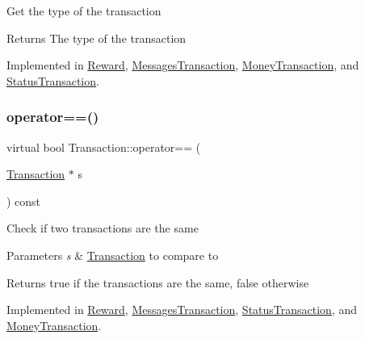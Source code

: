 Get the type of the transaction

\begin{DoxyReturn}{Returns}
The type of the transaction 
\end{DoxyReturn}


Implemented in \mbox{\hyperlink{classReward_a1d3d05263d54771a314927d09585968c}{Reward}}, \mbox{\hyperlink{classMessagesTransaction_a1893ac38468108811eb396366a3c0454}{Messages\+Transaction}}, \mbox{\hyperlink{classMoneyTransaction_a705918a47c0471ee7cf82bcdf0aeb5ef}{Money\+Transaction}}, and \mbox{\hyperlink{classStatusTransaction_a3c92b20549b681508ae7f49d282fdedc}{Status\+Transaction}}.

\mbox{\label{classTransaction_a9a17c97fdcda6791484ad6d07b34470e}} 
\subsubsection{\texorpdfstring{operator==()}{operator==()}}
{\footnotesize\ttfamily virtual bool Transaction\+::operator== (\begin{DoxyParamCaption}\item[{\mbox{\hyperlink{classTransaction}{Transaction}} $\ast$}]{s }\end{DoxyParamCaption}) const\hspace{0.3cm}{\ttfamily [pure virtual]}}

Check if two transactions are the same


\begin{DoxyParams}{Parameters}
{\em s} & \mbox{\hyperlink{classTransaction}{Transaction}} to compare to \\
\hline
\end{DoxyParams}
\begin{DoxyReturn}{Returns}
true if the transactions are the same, false otherwise 
\end{DoxyReturn}


Implemented in \mbox{\hyperlink{classReward_ab2cd65f16c670e3e9d8cfe84a6dc56cb}{Reward}}, \mbox{\hyperlink{classMessagesTransaction_aeeffbaa69d8432b6c12ca8fdf66e2e8b}{Messages\+Transaction}}, \mbox{\hyperlink{classStatusTransaction_a4d4c3a2be0d52e7f54675033cdf66881}{Status\+Transaction}}, and \mbox{\hyperlink{classMoneyTransaction_a9cd0b36a92155e91a25eb1b1435516d3}{Money\+Transaction}}.

\mbox{\label{classComponent_a3e63d8c993e417a4af3f56d65ebfc7ea}} 
